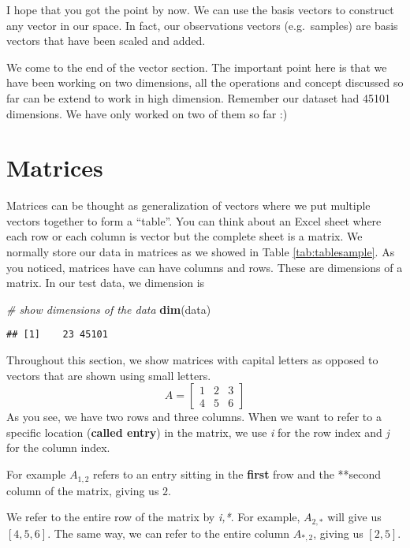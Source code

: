 \documentclass[
]{book}
\newenvironment{Shaded}{\begin{snugshade}}{\end{snugshade}}
\newcommand{\CommentTok}[1]{\textcolor[rgb]{0.56,0.35,0.01}{\textit{#1}}}
\newcommand{\KeywordTok}[1]{\textcolor[rgb]{0.13,0.29,0.53}{\textbf{#1}}}
\newcommand{\NormalTok}[1]{#1}
\theoremstyle{definition}
\theoremstyle{definition}
\theoremstyle{definition}
\theoremstyle{remark}
\begin{document}
I hope that you got the point by now. We can use the basis vectors to construct any vector in our space. In fact, our observations vectors (e.g.~samples) are basis vectors that have been scaled and added.

We come to the end of the vector section. The important point here is that we have been working on two dimensions, all the operations and concept discussed so far can be extend to work in high dimension. Remember our dataset had 45101 dimensions. We have only worked on two of them so far :)

\hypertarget{matrices}{%
\section{Matrices}\label{matrices}}

Matrices can be thought as generalization of vectors where we put multiple vectors together to form a ``table''. You can think about an Excel sheet where each row or each column is vector but the complete sheet is a matrix. We normally store our data in matrices as we showed in Table \ref{tab:tablesample}. As you noticed, matrices have can have columns and rows. These are dimensions of a matrix. In our test data, we dimension is

\begin{Shaded}
\begin{Highlighting}[]
\CommentTok{# show dimensions of the data}
\KeywordTok{dim}\NormalTok{(data)}
\end{Highlighting}
\end{Shaded}

\begin{verbatim}
## [1]    23 45101
\end{verbatim}

Throughout this section, we show matrices with capital letters as opposed to vectors that are shown using small letters.
\[
A=\begin{bmatrix}
1 & 2 & 3\\
4 & 5 & 6
\end{bmatrix}
\]
As you see, we have two rows and three columns. When we want to refer to a specific location (\textbf{called entry}) in the matrix, we use \emph{i} for the row index and \emph{j} for the column index.

For example \(A_{1,2}\) refers to an entry sitting in the \textbf{first} frow and the **second column of the matrix, giving us \(2\).

We refer to the entire row of the matrix by \emph{i,*}. For example, \(A_{2,*}\) will give us \([4,5,6]\). The same way, we can refer to the entire column \(A_{*,2}\), giving us \([2,5]\).
\end{document}
